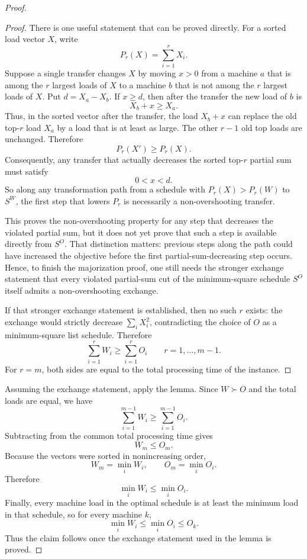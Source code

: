 \documentclass[11pt]{article}
\begin{document}
\begin{proof}
\begin{proof}
There is one useful statement that can be proved directly. For a sorted load
vector \(X\), write
\[
        P_r(X)=\sum_{i=1}^r X_i .
\]
Suppose a single transfer changes \(X\) by moving \(x>0\) from a machine \(a\)
that is among the \(r\) largest loads of \(X\) to a machine \(b\) that is not
among the \(r\) largest loads of \(X\). Put \(d=X_a-X_b\). If \(x\ge d\), then
after the transfer the new load of \(b\) is
\[
        X_b+x\ge X_a .
\]
Thus, in the sorted vector after the transfer, the load \(X_b+x\) can replace
the old top-\(r\) load \(X_a\) by a load that is at least as large. The other
\(r-1\) old top loads are unchanged. Therefore
\[
        P_r(X')\ge P_r(X).
\]
Consequently, any transfer that actually decreases the sorted top-\(r\)
partial sum must satisfy
\[
        0<x<d.
\]
So along any transformation path from a schedule with
\(P_r(X)>P_r(W)\) to \(S^W\), the first step that lowers \(P_r\) is necessarily
a non-overshooting transfer.

This proves the non-overshooting property for any step that decreases the
violated partial sum, but it does not yet prove that such a step is available
directly from \(S^O\). That distinction matters: previous steps along the path
could have increased the objective before the first partial-sum-decreasing step
occurs. Hence, to finish the majorization proof, one still needs the stronger
exchange statement that every violated partial-sum cut of the minimum-square
schedule \(S^O\) itself admits a non-overshooting exchange.

If that stronger exchange statement is established, then no such \(r\) exists:
the exchange would strictly decrease \(\sum_i X_i^2\), contradicting the choice
of \(O\) as a minimum-square list schedule. Therefore
\[
        \sum_{i=1}^r W_i
        \geq
        \sum_{i=1}^r O_i
        \qquad
        r=1,\dots,m-1.
\]
For \(r=m\), both sides are equal to the total processing time of the instance.
\end{proof}

Assuming the exchange statement, apply the lemma. Since $W\succ O$ and the
total loads are equal, we have
\[
        \sum_{i=1}^{m-1} W_i
        \geq
        \sum_{i=1}^{m-1} O_i .
\]
Subtracting from the common total processing time gives
\[
        W_m \leq O_m .
\]
Because the vectors were sorted in nonincreasing order,
\[
        W_m=\min_i W_i,
        \qquad
        O_m=\min_i O_i.
\]
Therefore
\[
        \min_i W_i
        \leq
        \min_i O_i.
\]
Finally, every machine load in the optimal schedule is at least the minimum
load in that schedule, so for every machine $k$,
\[
        \min_i W_i
        \leq
        \min_i O_i
        \leq
        O_k.
\]
Thus the claim follows once the exchange statement used in the lemma is proved.
\end{proof}
\end{document}
